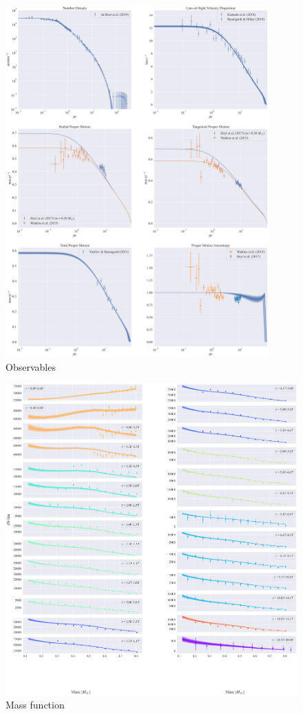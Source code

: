 \begin{figure}
	\centering
	\includegraphics[width=0.9\textwidth]{figures/low_bin_model/obs_panel.png}
	\caption{Observables}
	\label{fig:low_bin_model_obs_panel}
\end{figure}


\begin{figure}
	\centering
	\includegraphics[width=\textwidth]{figures/low_bin_model/mass_fun.png}
	\caption{Mass function}
	\label{fig:low_bin_model_mass_fun}
\end{figure}



